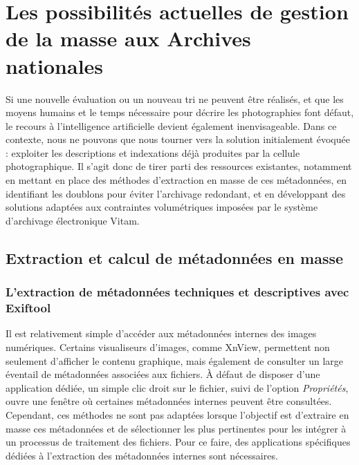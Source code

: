 \section{Les possibilités actuelles de gestion de la masse aux Archives nationales}

Si une nouvelle évaluation ou un nouveau tri ne peuvent être réalisés, et que les moyens humains et le temps nécessaire pour décrire les photographies font défaut, le recours à l'intelligence artificielle devient également inenvisageable. Dans ce contexte, nous ne pouvons que nous tourner vers la solution initialement évoquée : exploiter les descriptions et indexations déjà produites par la cellule photographique. Il s'agit donc de tirer parti des ressources existantes, notamment en mettant en place des méthodes d'extraction en masse de ces métadonnées, en identifiant les doublons pour éviter l'archivage redondant, et en développant des solutions adaptées aux contraintes volumétriques imposées par le système d'archivage électronique Vitam.

\subsection*{Extraction et calcul de métadonnées en masse}

\subsubsection*{L'extraction de métadonnées techniques et descriptives avec Exiftool}

Il est relativement simple d'accéder aux métadonnées internes des images numériques. Certains visualiseurs d'images, comme XnView, permettent non seulement d'afficher le contenu graphique, mais également de consulter un large éventail de métadonnées associées aux fichiers. À défaut de disposer d'une application dédiée, un simple clic droit sur le fichier, suivi de l'option \emph{Propriétés}, ouvre une fenêtre où certaines métadonnées internes peuvent être consultées. Cependant, ces méthodes ne sont pas adaptées lorsque l'objectif est d'extraire en masse ces métadonnées et de sélectionner les plus pertinentes pour les intégrer à un processus de traitement des fichiers. Pour ce faire, des applications spécifiques dédiées à l'extraction des métadonnées internes sont nécessaires.

